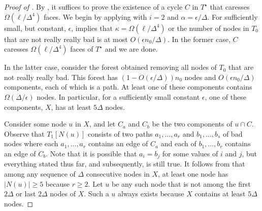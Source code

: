 \documentclass[a4paper,UKenglish]{socg-lipics-v2019}
\newcommand{\dual}[1]{{#1}^\star}
\begin{document}
\begin{proof}[Proof of ]
By , it suffices to prove the existence of
a cycle $C$ in $\dual{T}$ that caresses $\Omega(\ell/\Delta^4)$
faces.  We begin by applying  with
$i=2$ and $\alpha = \epsilon/\Delta$.  For sufficiently small, but constant,
$\epsilon$,  implies that $\kappa =
\Omega(\ell/\Delta^4)$ or the number of nodes in $T_0$ that are not really
really bad is at most $O(\epsilon n_0/\Delta)$.  In the former case,
$C$ caresses $\Omega(\ell/\Delta^4)$ faces of $\dual{T}$ and we are done.

In the latter case, consider the forest obtained removing
all nodes of $T_0$ that are not really really bad.  This forest has
$(1-O(\epsilon/\Delta))n_0$ nodes and $O(\epsilon n_0/\Delta)$ components,
each of which is a path.  At least one of these components contains
$\Omega(\Delta/\epsilon)$ nodes. In particular, for a sufficiently
small constant $\epsilon$, one of these components, $X$, has at least
$5\Delta$ nodes.


Consider some node $u$ in $X$, and let $C_a$ and $C_b$ be the
two components of $u\cap C$. Observe that $T_1[N(u)]$ consists
of two paths $a_1,\ldots,a_r$ and $b_1,\ldots,b_s$ of bad nodes
where each $a_1,\ldots,a_r$ contains an edge of $C_a$ and each of
$b_1,\ldots,b_r$ contains an edge of $C_b$. Note that it is
possible that $a_i=b_j$ for some values of $i$ and $j$, but everything
stated thus far, and subsequently, is still true. It follows from
 that among any sequence of $\Delta$
consecutive nodes in $X$, at least one node has $|N(u)|\ge 5$ because
$r\ge 2$.  Let $u$ be any such node that is not among the first $2\Delta$
or last $2\Delta$ nodes of $X$.  Such a $u$ always exists because $X$
contains at least $5\Delta$ nodes.


\end{proof}
\end{document}
